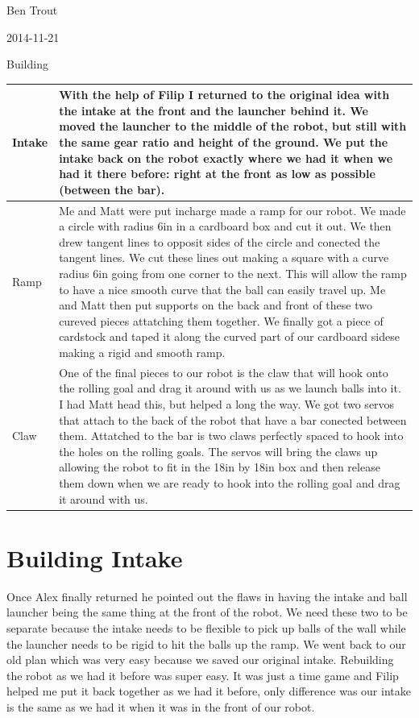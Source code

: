 Ben Trout

2014-11-21

Building  

\begin{tabular}{|p{5cm}|p{5cm}|}
\hline
 Intake&
With the help of Filip I returned to the original idea with the intake at the front and the launcher behind it. We moved the launcher to the middle of the robot, but still with the same gear ratio and height of the ground. We put the intake back on the robot exactly where we had it when we had it there before: right at the front as low as possible (between the bar).
\\
\hline
Ramp&
Me and Matt were put incharge made a ramp for our robot. We made a circle with radius 6in in a cardboard box and cut it out. We then drew tangent lines to opposit sides of the circle and conected the tangent lines. We cut these lines out making a square with a curve radius 6in going from one corner to the next. This will allow the ramp to have a nice smooth curve that the ball can easily travel up. Me and Matt then put supports on the back and front of these two cureved pieces attatching them together. We finally got a piece of cardstock and taped it along the curved part of our cardboard sidese making a rigid and smooth ramp. 
\\
\hline
Claw&
One of the final pieces to our robot is the claw that will hook onto the rolling goal and drag it around with us as we launch balls into it. I had Matt head this, but helped a long the way. We got two servos that attach to the back of the robot that have a bar conected between them. Attatched to the bar is two claws perfectly spaced to hook into the holes on the rolling goals. The servos will bring the claws up allowing the robot to fit in the 18in by 18in box and then release them down when we are ready to hook into the rolling goal and drag it around with us. 
\\
\hline
\end{tabular}

\section*{Building Intake}
Once Alex finally returned he pointed out the flaws in having the intake and ball launcher being the same thing at the front of the robot. We need these two to be separate because the intake needs to be flexible to pick up balls of the wall while the launcher needs to be rigid to hit the balls up the ramp. We went back to our old plan which was very easy because we saved our original intake. Rebuilding the robot as we had it before was super easy. It was just a time game and Filip helped me put it back together as we had it before, only difference was our intake is the same as we had it when it was in the front of our robot. 

